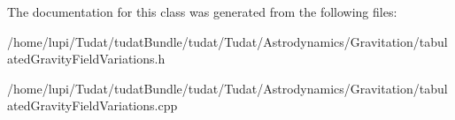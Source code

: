The documentation for this class was generated from the following files\+:\begin{DoxyCompactItemize}
\item 
/home/lupi/\+Tudat/tudat\+Bundle/tudat/\+Tudat/\+Astrodynamics/\+Gravitation/tabulated\+Gravity\+Field\+Variations.\+h\item 
/home/lupi/\+Tudat/tudat\+Bundle/tudat/\+Tudat/\+Astrodynamics/\+Gravitation/tabulated\+Gravity\+Field\+Variations.\+cpp\end{DoxyCompactItemize}
